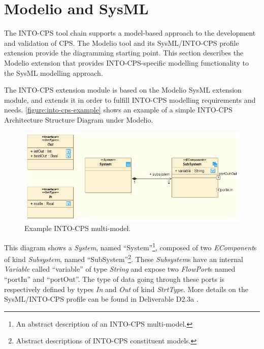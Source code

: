 
\section{Modelio and SysML}
\label{sec:SysML}
The INTO-CPS tool chain supports a model-based approach to the development and validation of CPS.
%
The Modelio tool and its SysML/INTO-CPS profile extension provide the diagramming starting point.
%
This section describes the Modelio extension that provides INTO-CPS-specific modelling functionality to the SysML modelling approach.

The INTO-CPS extension module is based on the Modelio SysML extension module, and extends it in order to fulfill INTO-CPS modelling requirements and needs.
%
\autoref{figure:into-cps-example} shows an example of a simple INTO-CPS Architecture Structure Diagram under Modelio.
%
%
%
\begin{figure}[hpt!]
\centering
\includegraphics[width=\textwidth]{./figures/modelio-intocps-extension.png}
\caption{Example INTO-CPS multi-model.}
\label{figure:into-cps-example}
\end{figure}
%
%
%
This diagram shows a \textit{System}, named ``System''\footnote{An abstract description of an INTO-CPS multi-model.},  composed of two \textit{EComponent}s of kind \textit{Subsystem}, named ``SubSystem''\footnote{Abstract descriptions of INTO-CPS constituent models.}. These \emph{Subsystem}s have an internal \textit{Variable} called ``variable'' of type \textit{String} and expose two \textit{FlowPort}s named ``portIn'' and ``portOut''. The type of data going through these ports is respectively defined by types \emph{In} and \emph{Out} of kind \textit{StrtType}.
%
More details on the SysML/INTO-CPS profile can be found in Deliverable D2.3a \cite{INTOCPSD2.3a}.

